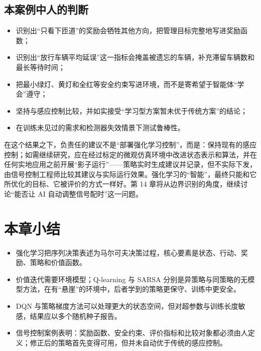 \subsection{本案例中人的判断}

\begin{itemize}
  \item 识别出“只看下匝道”的奖励会牺牲其他方向，把管理目标完整地写进奖励函数；
  \item 识别出“放行车辆平均延误”这一指标会掩盖被遗忘的车辆，补充滞留车辆数和最长等待时间；
  \item 把最小绿灯、黄灯和全红等安全约束写进环境，而不是寄希望于智能体“学会”遵守；
  \item 坚持与感应控制比较，并如实接受“学习型方案暂未优于传统方案”的结论；
  \item 在训练未见过的需求和检测器失效情景下测试鲁棒性。
\end{itemize}

在这个结果之下，负责任的建议不是“部署强化学习控制”，而是：保持现有的感应控制；如需继续研究，应在经过标定的微观仿真环境中改进状态表示和算法，并在任何实地应用之前开展“影子运行”——策略实时生成建议并记录，但不实际下发，由信号控制工程师比较其建议与实际运行效果。强化学习的“智能”，最终只能和它所优化的目标、它被评价的方式一样好。第 14 章将从边界识别的角度，继续讨论“能否让 AI 自动调整信号配时”这一问题。

\section{本章小结}

\begin{itemize}
  \item 强化学习把序列决策表述为马尔可夫决策过程，核心要素是状态、行动、奖励、策略和价值函数。
  \item 价值迭代需要环境模型；Q-learning 与 SARSA 分别是异策略与同策略的无模型方法，在有“悬崖”的环境中，后者学到的策略更保守、训练中更安全。
  \item DQN 与策略梯度方法可以处理更大的状态空间，但对超参数与训练长度敏感，结果应以多个随机种子报告。
  \item 信号控制案例表明：奖励函数、安全约束、评价指标和比较对象都必须由人定义；修正后的策略首先变得可用，但并未自动优于传统的感应控制。
\end{itemize}


